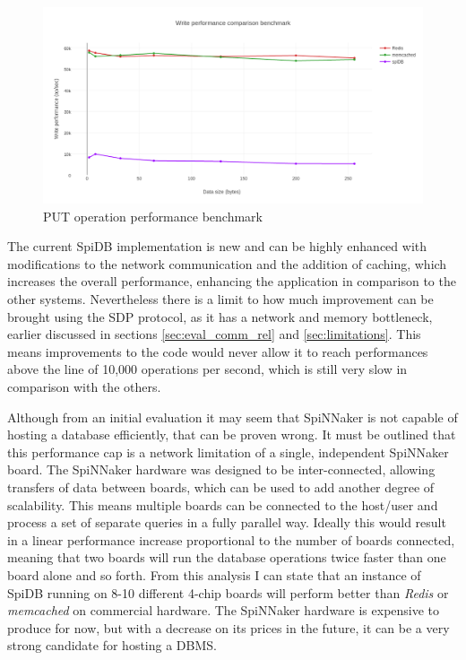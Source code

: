 \begin{figure}
\begin{center}
	\includegraphics[width=1.4\textwidth, natwidth=1063, natheight=509]{images/write_performance.png}
\end{center}
\caption{PUT operation performance benchmark}
\label{fig:write-perf-benchmark}
\end{figure}

The current SpiDB implementation is new and can be highly enhanced with modifications to the network communication and the addition of caching, which increases the overall performance, enhancing the application in comparison to the other systems. Nevertheless there is a limit to how much improvement can be brought using the SDP protocol, as it has a network and memory bottleneck, earlier discussed in sections \ref{sec:eval_comm_rel} and \ref{sec:limitations}. This means improvements to the code would never allow it to reach performances above the line of 10,000 operations per second, which is still very slow in comparison with the others.

Although from an initial evaluation it may seem that SpiNNaker is not capable of hosting a database efficiently, that can be proven wrong. It must be outlined that this performance cap is a network limitation of a single, independent SpiNNaker board. The SpiNNaker hardware was designed to be inter-connected, allowing transfers of data between boards, which can be used to add another degree of scalability. This means multiple boards can be connected to the host/user and process a set of separate queries in a fully parallel way. Ideally this would result in a linear performance increase proportional to the number of boards connected, meaning that two boards will run the database operations twice faster than one board alone and so forth. From this analysis I can state that an instance of SpiDB running on 8-10 different 4-chip boards will perform better than \textit{Redis} or \textit{memcached} on commercial hardware. The SpiNNaker hardware is expensive to produce for now, but with a decrease on its prices in the future, it can be a very strong candidate for hosting a DBMS.

